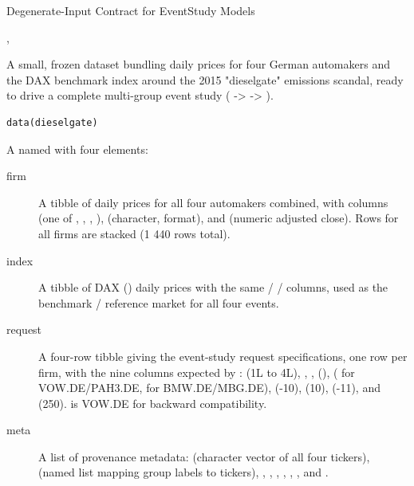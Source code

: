 \documentclass[a4paper]{book}
\begin{document}
%
\begin{Details}
Degenerate-Input Contract for EventStudy Models
\end{Details}
%
\begin{SeeAlso}
, 
\end{SeeAlso}
%
\begin{Description}
A small, frozen dataset bundling daily prices for four German automakers and
the DAX benchmark index around the 2015 "dieselgate" emissions scandal, ready
to drive a complete multi-group event study ( ->
 -> ).
\end{Description}
%
\begin{Usage}
\begin{verbatim}
data(dieselgate)
\end{verbatim}
\end{Usage}
%
\begin{Format}
A named  with four elements:
\begin{description}

\item[firm] A tibble of daily prices for all four automakers combined,
with columns  (one of , ,
, ),  (character,
 format), and  (numeric adjusted
close). Rows for all firms are stacked (1 440 rows total).
\item[index] A tibble of DAX () daily prices with the same
 /  /  columns, used as the
benchmark / reference market for all four events.
\item[request] A four-row tibble giving the event-study request
specifications, one row per firm, with the nine columns expected by
:  (1L to 4L),
, , 
(),  ( for
VOW.DE/PAH3.DE,  for BMW.DE/MBG.DE),
 (-10),  (10),
 (-11), and
 (250).  is
VOW.DE for backward compatibility.
\item[meta] A list of provenance metadata:  (character
vector of all four tickers),  (named list mapping group
labels to tickers), , , ,
, , , and .

\end{description}

\end{Format}
\end{document}
